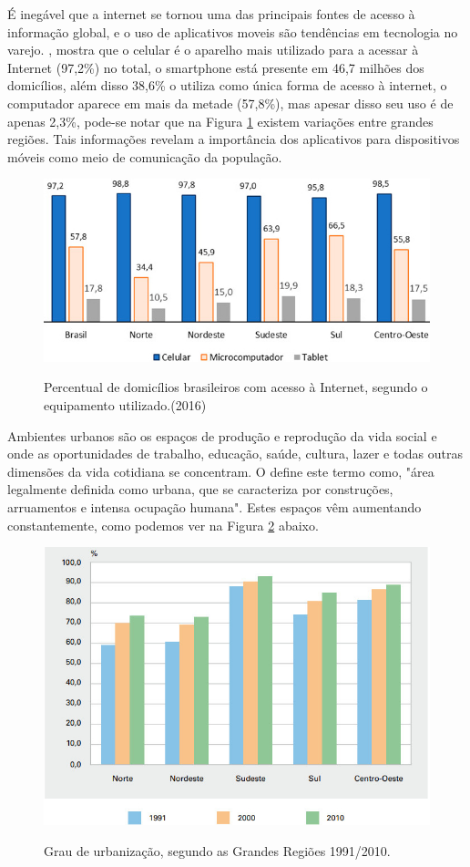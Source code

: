 É inegável que a internet se tornou uma das principais fontes de acesso à informação global, e o uso de aplicativos moveis são tendências em tecnologia no varejo. , mostra que o celular é o aparelho mais utilizado para a acessar à Internet (97,2\%) no total, o smartphone está presente em 46,7 milhões dos domicílios, além disso 38,6\% o utiliza como única forma de acesso à internet, o computador aparece em mais da metade (57,8\%), mas apesar disso seu uso é de apenas 2,3\%, pode-se notar que na Figura \ref{fig:internet} existem variações entre grandes regiões. Tais informações revelam a importância dos aplicativos para dispositivos móveis como meio de comunicação da população.
 \begin{figure}[H]
 	\centering
 	\caption{Percentual de domicílios brasileiros com acesso à Internet, segundo o equipamento utilizado.(2016)}
 	\includegraphics[width=0.6\linewidth]{Imagens/grafico}
	\label{fig:internet}
 \end{figure}

Ambientes urbanos são os espaços de produção e reprodução da vida social e onde as oportunidades de trabalho, educação, saúde, cultura, lazer e todas outras dimensões da vida cotidiana se concentram. O  define este termo como, "área legalmente definida como urbana, que se caracteriza por construções, arruamentos e intensa ocupação humana". Estes espaços vêm aumentando constantemente, como podemos ver na Figura \ref{fig:urban} abaixo.
\begin{figure}[H]
	\centering
 	\caption{Grau de urbanização, segundo as Grandes Regiões 1991/2010.} 
 	\includegraphics[width=0.6\linewidth]{Imagens/grafico2}		
	\label{fig:urban}
\end{figure}  

